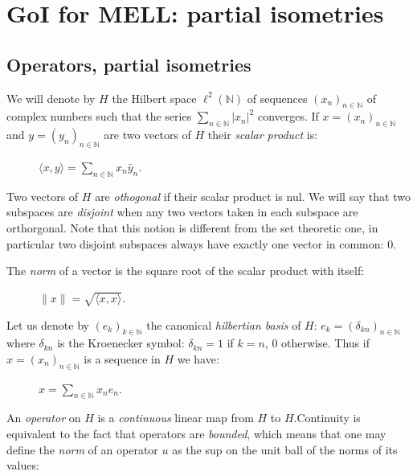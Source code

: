 \section{GoI for MELL: partial isometries}\label{goi-for-mell-partial-isometries}


\subsection{Operators, partial isometries}\label{operators-partial-isometries}

We will denote by \(H\) the Hilbert space \(\ell^2(\mathbb{N})\) of
sequences \((x_n)_{n\in\mathbb{N}}\) of complex numbers such that the
series \(\sum_{n\in\mathbb{N}}|x_n|^2\) converges. If
\(x = (x_n)_{n\in\mathbb{N}}\) and \(y = (y_n)_{n\in\mathbb{N}}\) are
two vectors of \(H\) their \emph{scalar product} is:

\begin{description}
\item[]
\(\langle x, y\rangle = \sum_{n\in\mathbb{N}} x_n\bar y_n\).
\end{description}

Two vectors of \(H\) are \emph{othogonal} if their scalar product is
nul. We will say that two subspaces are \emph{disjoint} when any two
vectors taken in each subspace are orthorgonal. Note that this notion is
different from the set theoretic one, in particular two disjoint
subspaces always have exactly one vector in common: \(0\).

The \emph{norm} of a vector is the square root of the scalar product
with itself:

\begin{description}
\item[]
\(\|x\| = \sqrt{\langle x, x\rangle}\).
\end{description}

Let us denote by \((e_k)_{k\in\mathbb{N}}\) the canonical
\emph{hilbertian basis} of \(H\):
\(e_k = (\delta_{kn})_{n\in\mathbb{N}}\) where \(\delta_{kn}\) is the
Kroenecker symbol: \(\delta_{kn}=1\) if \(k=n\), \(0\) otherwise. Thus
if \(x=(x_n)_{n\in\mathbb{N}}\) is a sequence in \(H\) we have:

\begin{description}
\item[]
\(x = \sum_{n\in\mathbb{N}} x_ne_n\).
\end{description}

An \emph{operator} on \(H\) is a \emph{continuous} linear map from \(H\)
to \(H\).Continuity is equivalent to the fact that operators are
\emph{bounded}, which means that one may define the \emph{norm} of an
operator \(u\) as the sup on the unit ball of the norms of its values:

